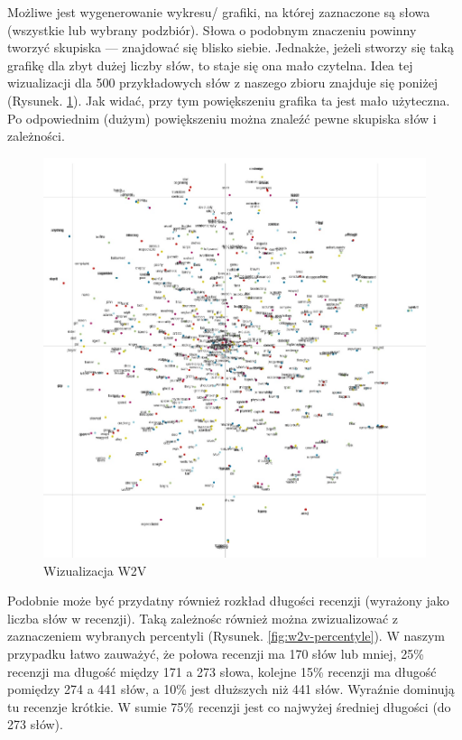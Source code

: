 \noindent Możliwe jest wygenerowanie wykresu/ grafiki, na której zaznaczone są słowa (wszystkie lub wybrany podzbiór). Słowa o podobnym znaczeniu powinny tworzyć skupiska --- znajdować się blisko siebie. Jednakże, jeżeli stworzy się taką grafikę dla zbyt dużej liczby słów, to staje się ona mało czytelna. Idea tej wizualizacji dla 500 przykładowych słów z naszego zbioru znajduje się poniżej (Rysunek. \ref{fig:w2v-kropki}). Jak widać, przy tym powiększeniu grafika ta jest mało użyteczna. Po odpowiednim (dużym) powiększeniu można znaleźć pewne skupiska słów i zależności.

\begin{figure}[H]
	\centering
	\includegraphics[width=0.95\linewidth]{images/chapter3/w2v-kropki.pdf}
	\caption{Wizualizacja W2V}
	\label{fig:w2v-kropki}
\end{figure}


\noindent Podobnie może być przydatny również rozkład długości recenzji (wyrażony jako liczba słów w recenzji).  Taką zależnośc również można zwizualizować z zaznaczeniem wybranych percentyli (Rysunek. \ref{fig:w2v-percentyle}). W naszym przypadku łatwo zauważyć, że połowa recenzji ma 170 słów lub mniej, 25\% recenzji ma długość między 171 a 273 słowa, kolejne 15\% recenzji ma długość pomiędzy 274 a 441 słów, a 10\% jest dłuższych niż 441 słów. Wyraźnie dominują tu recenzje krótkie. W sumie 75\% recenzji jest co najwyżej średniej długości (do 273 słów).

